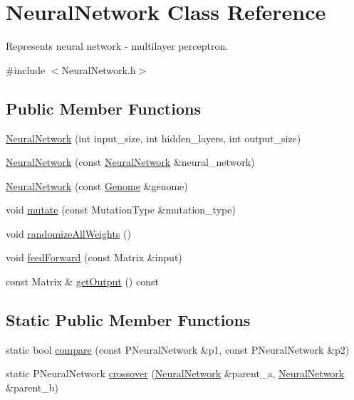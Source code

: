 \hypertarget{classNeuralNetwork}{}\section{Neural\+Network Class Reference}
\label{classNeuralNetwork}


Represents neural network -\/ multilayer perceptron.  




{\ttfamily \#include $<$Neural\+Network.\+h$>$}

\subsection*{Public Member Functions}
\begin{DoxyCompactItemize}
\item 
\hyperlink{classNeuralNetwork_a246f904545417df2801e56277ab8d53f}{Neural\+Network} (int input\+\_\+size, int hidden\+\_\+layers, int output\+\_\+size)
\item 
\hyperlink{classNeuralNetwork_a9b688c5f00977e83fedea7ee021348f1}{Neural\+Network} (const \hyperlink{classNeuralNetwork}{Neural\+Network} \&neural\+\_\+network)
\item 
\hyperlink{classNeuralNetwork_a772972afe658adbb165af9e8b384e552}{Neural\+Network} (const \hyperlink{classGenome}{Genome} \&genome)
\item 
void \hyperlink{classNeuralNetwork_a95ce793f6206c627f4d436be8348eede}{mutate} (const Mutation\+Type \&mutation\+\_\+type)
\item 
void \hyperlink{classNeuralNetwork_a94e3233f8f2f6c2f1e205b67ddca7adf}{randomize\+All\+Weights} ()
\item 
void \hyperlink{classNeuralNetwork_a06a48c985365b4f933d0abe8dc894a1c}{feed\+Forward} (const Matrix \&input)
\item 
const Matrix \& \hyperlink{classNeuralNetwork_a151d07a86bcb717704c3ff8a2f6f35ad}{get\+Output} () const 
\end{DoxyCompactItemize}
\subsection*{Static Public Member Functions}
\begin{DoxyCompactItemize}
\item 
static bool \hyperlink{classNeuralNetwork_ac6e9655da50b97ca94f4e34bf3de3adc}{compare} (const P\+Neural\+Network \&p1, const P\+Neural\+Network \&p2)
\item 
static P\+Neural\+Network \hyperlink{classNeuralNetwork_a1168869bf81b753ae8b20ea518e11593}{crossover} (\hyperlink{classNeuralNetwork}{Neural\+Network} \&parent\+\_\+a, \hyperlink{classNeuralNetwork}{Neural\+Network} \&parent\+\_\+b)
\end{DoxyCompactItemize}


